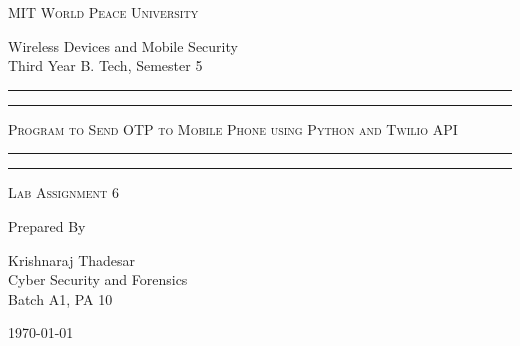 \documentclass[11pt]{article}
\begin{document}
\begin{titlepage}
    \centering


    \huge\textsc{
        MIT World Peace University
    }\\

    \vspace{0.75\baselineskip} %

    \LARGE{
        Wireless Devices and Mobile Security\\
        Third Year B. Tech, Semester 5
    }

    \vfill %


    \rule{\textwidth}{1.6pt}\vspace*{-\baselineskip}\vspace*{2pt}
    \rule{\textwidth}{0.6pt}
    \vspace{0.75\baselineskip} %

    \huge{\textsc{
            Program to Send OTP to Mobile Phone using Python and Twilio API
        }} \\

    \vspace{0.5\baselineskip} %
    \rule{\textwidth}{0.6pt}\vspace*{-\baselineskip}\vspace*{2.8pt}
    \rule{\textwidth}{1.6pt}

    \vspace{1\baselineskip} %


    \LARGE\textsc{
        Lab Assignment 6
    } %
    \vfill


    Prepared By \vspace{0.5\baselineskip} %

    \Large{
        Krishnaraj Thadesar \\
        Cyber Security and Forensics\\
        Batch A1, PA 10
    }

    \vspace{0.5\baselineskip} %
    \today

\end{titlepage}
\end{document}
